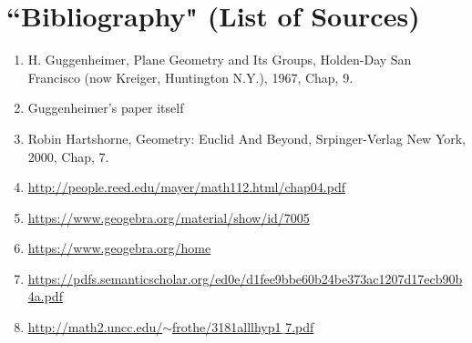 \documentclass[12pt]{article}
\theoremstyle{plain}
\theoremstyle{definition}
\begin{document}
\newpage
\section*{``Bibliography" (List of Sources)}


\begin{enumerate}
	\item H. Guggenheimer, Plane Geometry and Its Groups, Holden-Day San Francisco (now Kreiger, Huntington N.Y.), 1967, Chap, 9.
	\item Guggenheimer's paper itself
	\item Robin Hartshorne, Geometry: Euclid And Beyond, Srpinger-Verlag New York, 2000, Chap, 7.
	\item \href{http://people.reed.edu/mayer/math112.html/chap04.pdf}{http://people.reed.edu/mayer/math112.html/chap04.pdf}
	\item \href{https://www.geogebra.org/material/show/id/7005}{https://www.geogebra.org/material/show/id/7005}
	\item \href{https://www.geogebra.org/home}{https://www.geogebra.org/home}
	\item \href{https://pdfs.semanticscholar.org/ed0e/d1fee9bbe60b24be373ac1207d17ecb90b4a.pdf}{https://pdfs.semanticscholar.org/ed0e/d1fee9bbe60b24be373ac1207d17ecb90b4a.pdf}
	\item \href{http://math2.uncc.edu/~frothe/3181alllhyp1_7.pdf}{http://math2.uncc.edu/$\sim$frothe/3181alllhyp1$\_$7.pdf}
\end{enumerate}
\end{document}
